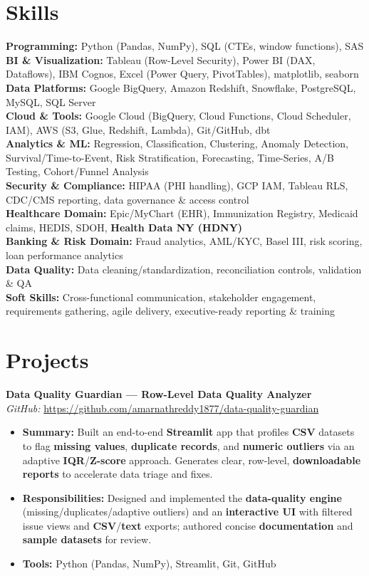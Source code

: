 \documentclass[9.5pt]{article}
\begin{document}
\section*{Skills}
\textbf{Programming:} Python (Pandas, NumPy), SQL (CTEs, window functions), SAS\\
\textbf{BI \& Visualization:} Tableau (Row-Level Security), Power BI (DAX, Dataflows), IBM Cognos, Excel (Power Query, PivotTables), matplotlib, seaborn\\
\textbf{Data Platforms:} Google BigQuery, Amazon Redshift, Snowflake, PostgreSQL, MySQL, SQL Server\\
\textbf{Cloud \& Tools:} Google Cloud (BigQuery, Cloud Functions, Cloud Scheduler, IAM), AWS (S3, Glue, Redshift, Lambda), Git/GitHub, dbt\\
\textbf{Analytics \& ML:} Regression, Classification, Clustering, Anomaly Detection, Survival/Time-to-Event, Risk Stratification, Forecasting, Time-Series, A/B Testing, Cohort/Funnel Analysis\\
\textbf{Security \& Compliance:} HIPAA (PHI handling), GCP IAM, Tableau RLS, CDC/CMS reporting, data governance \& access control\\
\textbf{Healthcare Domain:} Epic/MyChart (EHR), Immunization Registry, Medicaid claims, HEDIS, SDOH, \textbf{Health Data NY (HDNY)}\\
\textbf{Banking \& Risk Domain:} Fraud analytics, AML/KYC, Basel III, risk scoring, loan performance analytics\\
\textbf{Data Quality:} Data cleaning/standardization, reconciliation controls, validation \& QA\\
\textbf{Soft Skills:} Cross-functional communication, stakeholder engagement, requirements gathering, agile delivery, executive-ready reporting \& training

\section*{Projects}

\textbf{Data Quality Guardian — Row-Level Data Quality Analyzer} \\
\textit{GitHub:} \url{https://github.com/amarnathreddy1877/data-quality-guardian}

\begin{itemize}[leftmargin=*]
  \item \textbf{Summary:} Built an end-to-end \textbf{Streamlit} app that profiles \textbf{CSV} datasets to flag \textbf{missing values}, \textbf{duplicate records}, and \textbf{numeric outliers} via an adaptive \textbf{IQR}/\textbf{Z-score} approach. Generates clear, row-level, \textbf{downloadable reports} to accelerate data triage and fixes.
  \item \textbf{Responsibilities:} Designed and implemented the \textbf{data-quality engine} (missing/duplicates/adaptive outliers) and an \textbf{interactive UI} with filtered issue views and \textbf{CSV}/\textbf{text} exports; authored concise \textbf{documentation} and \textbf{sample datasets} for review.
  \item \textbf{Tools:} Python (Pandas, NumPy), Streamlit, Git, GitHub
\end{itemize}
\end{document}
